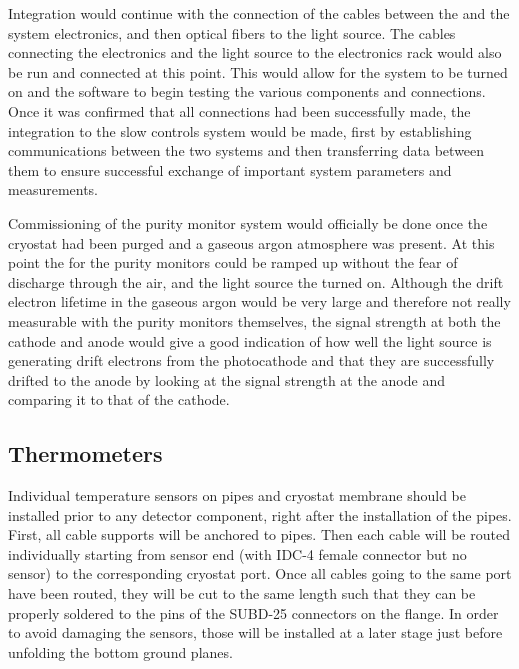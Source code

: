 Integration would continue with the connection of the  cables between the \fdth and the system  electronics, and then optical fibers to the light source.  The cables connecting the  electronics and the light source to the electronics rack would also be run and connected at this point.  This would allow for the system to be turned on and the software to begin testing the various components and connections.  Once it was confirmed that all connections had been successfully made, the integration to the slow controls system would be made, first by establishing communications between the two systems and then transferring data between them to ensure successful exchange of important system parameters and measurements.  

Commissioning of the purity monitor system would officially be done once the cryostat had been purged and a gaseous argon atmosphere was present.  At this point the  for the purity monitors could be ramped up without the fear of discharge through the air, and the light source the turned on.  Although the drift electron lifetime in the gaseous argon would be very large and therefore not really measurable with the purity monitors themselves, the signal strength at both the cathode and anode would give a good indication of how well the light source is generating drift electrons from the photocathode and that they are successfully drifted to the anode by looking at the signal strength at the anode and comparing it to that of the cathode.


\subsection{Thermometers}
\label{sec:fdgen-slow-cryo-instal-th}


Individual temperature sensors on pipes and cryostat membrane should be installed prior to any detector component, right after the installation of the pipes.
First, all cable supports will be anchored to pipes. Then each cable will be routed individually starting from sensor end (with IDC-4 female connector but no sensor)
to the corresponding cryostat port. Once all cables going to the same port have been routed, they will be cut to the same length such that they can be properly soldered
to the pins of the SUBD-25 connectors on the flange. In order to avoid damaging the sensors, those will be installed at a later stage just before unfolding the bottom ground planes.

